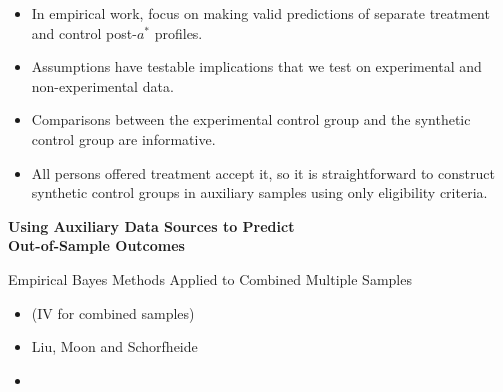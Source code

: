 \documentclass[static]{JJH-Beamer}
\begin{document}

\begin{itemize}
\item In empirical work, focus on making valid predictions of separate treatment and control post-$a^*$ profiles.
\item Assumptions have testable implications that we test on experimental and non-experimental data.
\item Comparisons between the experimental control group and the synthetic control group are informative.
\item All persons offered treatment accept it, so it is straightforward to construct synthetic control groups in auxiliary samples using only eligibility criteria.
\end{itemize}

\begin{frame}

\begin{center}
\textbf{Using Auxiliary Data Sources to Predict\\ Out-of-Sample Outcomes}
\end{center}

\end{frame}

\begin{frame}

\begin{center}
Empirical Bayes Methods Applied to Combined Multiple Samples
\end{center}

\end{frame}

\begin{itemize}
\item \citet{Ichimura-Martinez-Sanchis_2009_Estimation} (IV for combined samples)
\item Liu, Moon and Schorfheide \citeyearpar{Liu_etal_2016_Forecasting}
\item \citet{Gu-Koenker_2016_Bayesball-JAE}
\end{itemize}
\end{document}
